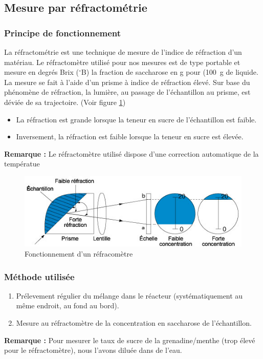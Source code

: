 \documentclass[a4paper,11pt, french]{article}
\begin{document}
	\subsection{Mesure par réfractométrie}
		\subsubsection{Principe de fonctionnement}
			La réfractométrie est une technique de mesure de l'indice de réfraction d'un matériau. Le réfractomètre utilisé pour nos mesures est de type portable et mesure en degrés Brix ($^{\circ}$B) la fraction de saccharose en \si{\gram} pour (\SI{100}{\gram} de liquide. La mesure se fait à l'aide d'un prisme à indice de réfraction élevé. Sur base du phénomène de réfraction, la lumière, au passage de l'échantillon au prisme, est déviée de sa trajectoire. (Voir figure \ref{refractometrie})
			\begin{itemize}
				\item La réfraction est grande lorsque la teneur en sucre de l'échantillon est faible.
				\item Inversement, la réfraction est faible lorsque la teneur en sucre est élevée.
			\end{itemize}
			\textbf{Remarque :} Le réfractomètre utilisé dispose d'une correction automatique de la températue
			\begin{figure}[h]
				\centering
				\includegraphics[width=1.0\textwidth]{pictures/refractometre.jpg}
				\caption{Fonctionnement d'un réfracomètre\label{refractometrie}\protect\footnotemark}
			\end{figure}
		\subsubsection{Méthode utilisée}
			\begin{enumerate}
				\item Prélevement régulier du mélange dans le réacteur (systématiquement au même endroit, au fond au bord).
				\item Mesure au réfractomètre de la concentration en saccharose de l'échantillon.
			\end{enumerate}
			\textbf{Remarque :} Pour mesurer le taux de sucre de la grenadine/menthe (trop élevé pour le réfractomètre), nous l'avons diluée dans de l'eau.
\end{document}
